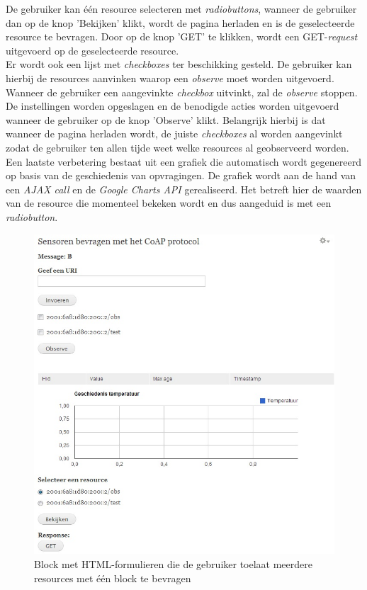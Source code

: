 De gebruiker kan \'{e}\'{e}n resource selecteren met \textit{radiobuttons}, wanneer de gebruiker dan op de knop 'Bekijken' klikt, wordt de pagina herladen en is de geselecteerde resource te bevragen. Door op de knop 'GET' te klikken, wordt een GET-\textit{request} uitgevoerd op de geselecteerde resource.\\
Er wordt ook een lijst met \textit{checkboxes} ter beschikking gesteld. De gebruiker kan hierbij de resources aanvinken waarop een \textit{observe} moet worden uitgevoerd. Wanneer de gebruiker een aangevinkte \textit{checkbox} uitvinkt, zal de \textit{observe} stoppen. De instellingen worden opgeslagen en de benodigde acties worden uitgevoerd wanneer de gebruiker op de knop 'Observe' klikt. Belangrijk hierbij is dat wanneer de pagina herladen wordt, de juiste \textit{checkboxes} al worden aangevinkt zodat de gebruiker ten allen tijde weet welke resources al geobserveerd worden.\\
Een laatste verbetering bestaat uit een grafiek die automatisch wordt gegenereerd op basis van de geschiedenis van opvragingen. De grafiek wordt aan de hand van een \textit{AJAX call} en de \textit{Google Charts API} \cite{googleCharts} gerealiseerd. Het betreft hier de waarden van de resource die momenteel bekeken wordt en dus aangeduid is met een \textit{radiobutton}.

\begin{figure}[h!]
\centering
\includegraphics[width=1\textwidth]{fig/meerdere_resources}
\caption{Block met HTML-formulieren die de gebruiker toelaat meerdere resources met \'{e}\'{e}n block te bevragen}
\label{fig:meerdereResources}
\end{figure}


